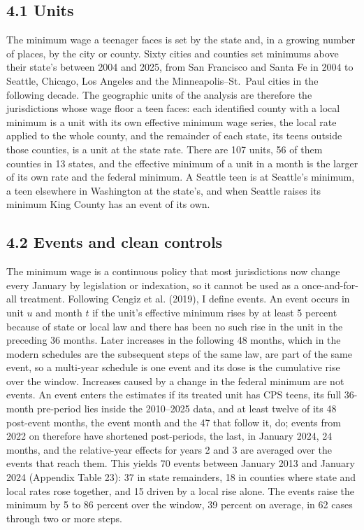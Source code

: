 \documentclass[12pt]{article}
\begin{document}
\subsection{4.1 Units}

The minimum wage a teenager faces is set by the state and, in a growing number of places, by the city or county. Sixty cities and counties set minimums above their state's between 2004 and 2025, from San Francisco and Santa Fe in 2004 to Seattle, Chicago, Los Angeles and the Minneapolis--St.\ Paul cities in the following decade. The geographic units of the analysis are therefore the jurisdictions whose wage floor a teen faces: each identified county with a local minimum is a unit with its own effective minimum wage series, the local rate applied to the whole county, and the remainder of each state, its teens outside those counties, is a unit at the state rate. There are 107 units, 56 of them counties in 13 states, and the effective minimum of a unit in a month is the larger of its own rate and the federal minimum. A Seattle teen is at Seattle's minimum, a teen elsewhere in Washington at the state's, and when Seattle raises its minimum King County has an event of its own.

\subsection{4.2 Events and clean controls}

The minimum wage is a continuous policy that most jurisdictions now change every January by legislation or indexation, so it cannot be used as a once-and-for-all treatment. Following Cengiz et al. (2019), I define events. An event occurs in unit $u$ and month $t$ if the unit's effective minimum rises by at least 5 percent because of state or local law and there has been no such rise in the unit in the preceding 36 months. Later increases in the following 48 months, which in the modern schedules are the subsequent steps of the same law, are part of the same event, so a multi-year schedule is one event and its dose is the cumulative rise over the window. Increases caused by a change in the federal minimum are not events. An event enters the estimates if its treated unit has CPS teens, its full 36-month pre-period lies inside the 2010--2025 data, and at least twelve of its 48 post-event months, the event month and the 47 that follow it, do; events from 2022 on therefore have shortened post-periods, the last, in January 2024, 24 months, and the relative-year effects for years 2 and 3 are averaged over the events that reach them. This yields 70 events between January 2013 and January 2024 (Appendix Table 23): 37 in state remainders, 18 in counties where state and local rates rose together, and 15 driven by a local rise alone. The events raise the minimum by 5 to 86 percent over the window, 39 percent on average, in 62 cases through two or more steps.
\end{document}
